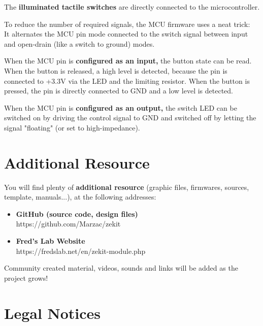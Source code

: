 \documentclass{scrartcl}
\begin{document}
The \textbf{illuminated tactile switches} are directly connected to the microcontroller.

To reduce the number of required signals, the MCU firmware uses a neat trick: \\
It alternates the MCU pin mode connected to the switch signal between input and open-drain (like a switch to ground) modes.

When the MCU pin is \textbf{configured as an input,} the button state can be read.
When the button is released, a high level is detected, because the pin is connected to +3.3V via the LED and the limiting resistor.
When the button is pressed, the pin is directly connected to GND and a low level is detected.

When the MCU pin is \textbf{configured as an output,} the switch LED can be switched on by driving the control signal to GND and switched off by letting the signal "floating" (or set to high-impedance).

\pagebreak
\section{Additional Resource}
You will find plenty of \textbf{additional resource} (graphic files, firmwares, sources, template, manuals...), at the following addresses:

\vspace{0.25cm}
\begin{itemize}
    \item \textbf{GitHub (source code, design files)} \\
          https://github.com/Marzac/zekit
          \vspace{0.25cm}
    \item \textbf{Fred's Lab Website} \\
          https://fredslab.net/en/zekit-module.php
\end{itemize}

\vspace{0.25cm}
Community created material, videos, sounds and links will be added as the project grows!


\section{Legal Notices}
\end{document}
